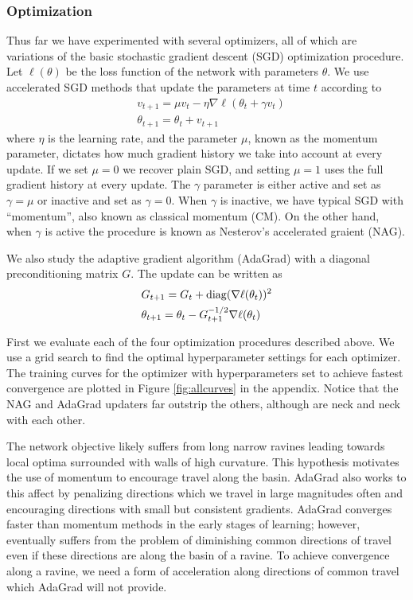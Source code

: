 \subsubsection*{Optimization}

Thus far we have experimented with several optimizers, all of which are
variations of the basic stochastic gradient descent (SGD) optimization
procedure. Let $\ell(\theta)$ be the loss function of the network with
parameters $\theta$. We use accelerated SGD methods that update the parameters
at time $t$ according to
\begin{align*}
&v_{t+1} = \mu v_t - \eta \nabla \ell (\theta_t + \gamma v_t) \\
&\theta_{t+1} = \theta_t + v_{t+1}
\end{align*}
where $\eta$ is the learning rate, and the parameter $\mu$, known as the momentum
parameter, dictates how much gradient history we take into account at every
update. If we set $\mu = 0$ we recover plain SGD, and setting $\mu = 1$ uses
the full gradient history at every update.  The $\gamma$ parameter is either
active and set as $\gamma = \mu$ or inactive and set as $\gamma = 0$.  When
$\gamma$ is inactive, we have typical SGD with ``momentum'', also known as
classical momentum (CM). On the other hand, when $\gamma$ is active the
procedure is known as Nesterov's accelerated graient (NAG).

We also study the adaptive gradient algorithm (AdaGrad) with a diagonal
preconditioning matrix $G$. The update can be written as
\begin{align*}
&G_{t+1} = G_{t} + \operatorname*{diag}(\nabla \ell (\theta_t))^2 \\
&\theta_{t+1} = \theta_t - G_{t+1}^{-1/2} \nabla \ell(\theta_t)
\end{align*} 

First we evaluate each of the four optimization procedures described above. We
use a grid search to find the optimal hyperparameter settings for each
optimizer. The training curves for the optimizer with hyperparameters set to
achieve fastest convergence are plotted in Figure \ref{fig:allcurves} in the
appendix. Notice that the NAG and AdaGrad updaters far outstrip the others,
although are neck and neck with each other.

The network objective likely suffers from long narrow ravines leading towards
local optima surrounded with walls of high curvature. This hypothesis motivates
the use of momentum to encourage travel along the basin. AdaGrad also works to
this affect by penalizing directions which we travel in large magnitudes often
and encouraging directions with small but consistent gradients. AdaGrad
converges faster than momentum methods in the early stages of learning;
however, eventually suffers from the problem of diminishing common directions
of travel even if these directions are along the basin of a ravine. To achieve
convergence along a ravine, we need a form of acceleration along directions of
common travel which AdaGrad will not provide. 

